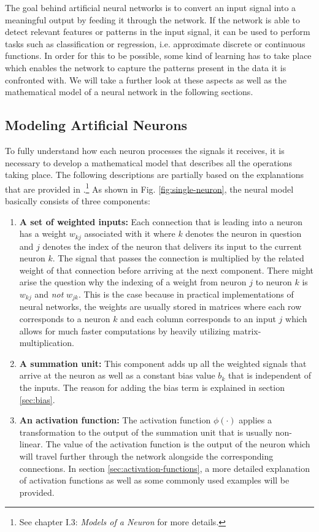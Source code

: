 The goal behind artificial neural networks is to convert an input
signal into a meaningful output by feeding it through the network. If
the network is able to detect relevant features or patterns in the
input signal, it can be used to perform tasks such as classification
or regression, i.e. approximate discrete or continuous functions.
In order for this to be possible, some kind of learning has to take
place which enables the network to capture the patterns present in
the data it
is confronted with. We will take a further look at these aspects as
well as the mathematical model of a neural network in the following
sections.

\subsection{Modeling Artificial Neurons}
\label{sec:artificial-neurons}
To fully understand how each neuron processes the signals it receives,
it is necessary to develop a mathematical model that describes all the
operations taking place. The following descriptions are partially
based on the explanations that are provided in \cite{Haykin}.\footnote{See
  chapter I.3: \textit{Models of a Neuron} for more details.}
As shown in Fig. \ref{fig:single-neuron}, the neural model
basically consists of three components:
\begin{enumerate}
  \item \textbf{A set of weighted inputs:} Each connection that is
    leading into a neuron has a weight \(w_{kj}\) associated with it
    where \(k\) denotes the neuron in question and \(j\) denotes the
    index of the neuron that delivers its input to the current neuron
    \(k\). The signal that
    passes the connection is multiplied by the
    related weight of that connection before arriving at the next
    component.
    There might arise the question why the indexing of
    a weight from neuron \(j\) to neuron \(k\) is \(w_{kj}\) and
    \textit{not} \(w_{jk}\). This is the case because in practical
    implementations of neural networks, the weights are
    usually stored in matrices where each row corresponds to a
    neuron \(k\) and each column corresponds to an input \(j\) which
    allows for much faster computations by heavily utilizing
    matrix-multiplication.
  \item \textbf{A summation unit:} This component adds up all the
    weighted signals that arrive at the neuron as well as a constant
    bias value
    \(b_k\) that is independent of the inputs. The reason for adding
    the bias term is explained in section \ref{sec:bias}.
  \item \textbf{An activation function:} The activation function
    \(\phi(\cdot)\) applies a transformation to the output of the
    summation unit that is usually non-linear. The value of
    the activation function is the output of the neuron which will
    travel further through the network alongside the corresponding
    connections. In section \ref{sec:activation-functions}, a more
    detailed explanation of activation functions as well as some
    commonly used examples will be provided.
\end{enumerate}
